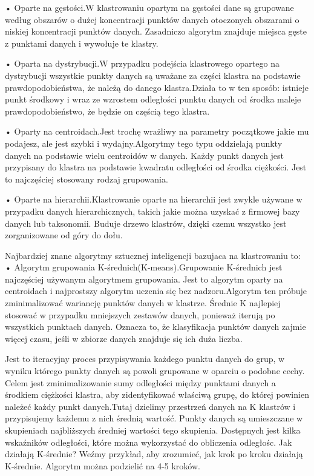  •  Oparte na gęstości.W klastrowaniu opartym na gęstości dane są grupowane według obszarów o dużej koncentracji punktów danych otoczonych obszarami o niskiej koncentracji punktów danych. Zasadniczo algorytm znajduje miejsca gęste z punktami danych i wywołuje te klastry.

 •  Oparta na dystrybucji.W przypadku podejścia klastrowego opartego na dystrybucji wszystkie punkty danych są uważane za części klastra na podstawie prawdopodobieństwa, że należą do danego klastra.Działa to w ten sposób: istnieje punkt środkowy i wraz ze wzrostem odległości punktu danych od środka maleje prawdopodobieństwo, że będzie on częścią tego klastra.

  •  Oparty na centroidach.Jest trochę wrażliwy na parametry początkowe jakie mu podajesz, ale jest szybki i wydajny.Algorytmy tego typu oddzielają punkty danych na podstawie wielu centroidów w danych. Każdy punkt danych jest przypisany do klastra na podstawie kwadratu odległości od środka ciężkości. Jest to najczęściej stosowany rodzaj grupowania.
  
  •  Oparte na hierarchii.Klastrowanie oparte na hierarchii jest zwykle używane w przypadku danych hierarchicznych, takich jakie można uzyskać z firmowej bazy danych lub taksonomii. Buduje drzewo klastrów, dzięki czemu wszystko jest zorganizowane od góry do dołu.\cite{clust2020}

Najbardziej znane algorytmy sztucznej inteligencji bazujaca na klastrowaniu to:
  • Algorytm grupowania K-średnich(K-means).Grupowanie K-średnich jest najczęściej używanym algorytmem grupowania. Jest to algorytm oparty na centroidach i najprostszy algorytm uczenia się bez nadzoru.Algorytm ten próbuje zminimalizować wariancję punktów danych w klastrze. Średnie K najlepiej stosować w przypadku mniejszych zestawów danych, ponieważ iterują po wszystkich punktach danych. Oznacza to, że klasyfikacja punktów danych zajmie więcej czasu, jeśli w zbiorze danych znajduje się ich duża liczba.\cite{clust2020}

Jest to iteracyjny proces przypisywania każdego punktu danych do grup, w wyniku którego punkty danych są powoli grupowane w oparciu o podobne cechy. Celem jest zminimalizowanie sumy odległości między punktami danych a środkiem ciężkości klastra, aby zidentyfikować właściwą grupę, do której powinien należeć każdy punkt danych.Tutaj dzielimy przestrzeń danych na K klastrów i przypisujemy każdemu z nich średnią wartość. Punkty danych są umieszczane w skupieniach najbliższych średniej wartości tego skupienia. Dostępnych jest kilka wskaźników odległości, które można wykorzystać do obliczenia odległośc.
Jak działają K-średnie?
Weźmy przykład, aby zrozumieć, jak krok po kroku działają K-średnie. Algorytm można podzielić na 4-5 kroków.


